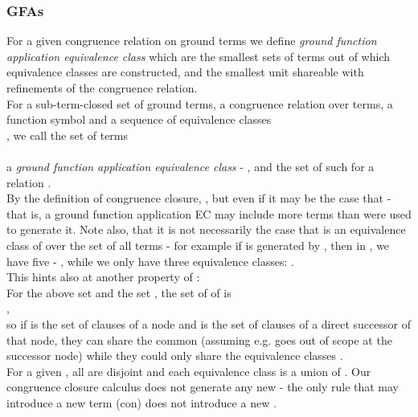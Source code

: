 \subsubsection{GFAs}
For a given congruence relation on ground terms we define \emph{ground function application equivalence class} 
which are the smallest sets of terms out of which equivalence classes are constructed, and the smallest unit shareable with refinements of the congruence relation.\\
For a sub-term-closed set  of ground terms, a congruence relation  over terms, a function symbol  and a sequence of equivalence classes \\
, we call the set of terms \\
 \\
a \emph{ground function application equivalence class} - \GFAEC, and the set of such \GFAECSet for a relation  .\\
By the definition of congruence closure, , 
but even if  it may be the case that  - that is, a ground function application EC may include more terms than were used to generate it.
Note also, that it is not necessarily the case that  is an equivalence class of  over the set of all terms - for example if  is generated by , then in , we have five \GFAECSet - 
, while we only have three equivalence classes: .\\
This hints also at another property of \GFAECSet: \\
For the above set  and the set , 
the set of \GFAECSet of  is \\
, \\
so if  is the set of clauses of a node and  is the set of clauses of a direct successor of that node, they can share the common \GFAECSet {} (assuming e.g.  goes out of scope at the successor node) while they could only share the equivalence classes .\\
For a given , all \GFAECSet are disjoint and each equivalence class is a union of \GFAECSet.
Our congruence closure calculus  does not generate any new \GFAECSet - the only rule that may introduce a new term (con) does not introduce a new \GFAEC.

